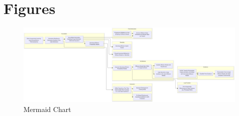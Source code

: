 \documentclass[conference]{IEEEtran}
\begin{document}
\clearpage
\nocite{*}

 

\clearpage
\appendices\label{appendix}
\onecolumn
\section{Figures}

\begin{figure}[H]
    \centering
    \includegraphics[width=\textwidth]{figures/figure1_mermaid.png}
    \caption{Mermaid Chart} \label{fig:fig1}
\end{figure} \FloatBarrier
\end{document}
